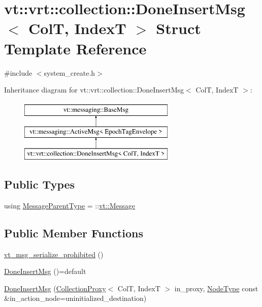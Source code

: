 \hypertarget{structvt_1_1vrt_1_1collection_1_1_done_insert_msg}{}\section{vt\+:\+:vrt\+:\+:collection\+:\+:Done\+Insert\+Msg$<$ ColT, IndexT $>$ Struct Template Reference}
\label{structvt_1_1vrt_1_1collection_1_1_done_insert_msg}


{\ttfamily \#include $<$system\+\_\+create.\+h$>$}

Inheritance diagram for vt\+:\+:vrt\+:\+:collection\+:\+:Done\+Insert\+Msg$<$ ColT, IndexT $>$\+:\begin{figure}[H]
\begin{center}
\leavevmode
\includegraphics[height=3.000000cm]{structvt_1_1vrt_1_1collection_1_1_done_insert_msg}
\end{center}
\end{figure}
\subsection*{Public Types}
\begin{DoxyCompactItemize}
\item 
using \hyperlink{structvt_1_1vrt_1_1collection_1_1_done_insert_msg_a17cd2dd89315b0b113809e54f5a86b6a}{Message\+Parent\+Type} = \+::\hyperlink{namespacevt_a3a3ddfef40b4c90915fa43cdd5f129ea}{vt\+::\+Message}
\end{DoxyCompactItemize}
\subsection*{Public Member Functions}
\begin{DoxyCompactItemize}
\item 
\hyperlink{structvt_1_1vrt_1_1collection_1_1_done_insert_msg_af9c11a30581c60e18dfa0cee4841d793}{vt\+\_\+msg\+\_\+serialize\+\_\+prohibited} ()
\item 
\hyperlink{structvt_1_1vrt_1_1collection_1_1_done_insert_msg_a74e87cb9d8c83b77960b544e61cee9ef}{Done\+Insert\+Msg} ()=default
\item 
\hyperlink{structvt_1_1vrt_1_1collection_1_1_done_insert_msg_add6d51da4d2b2e79624fb8f153d1cea4}{Done\+Insert\+Msg} (\hyperlink{structvt_1_1vrt_1_1collection_1_1_collection_proxy}{Collection\+Proxy}$<$ ColT, IndexT $>$ in\+\_\+proxy, \hyperlink{namespacevt_a866da9d0efc19c0a1ce79e9e492f47e2}{Node\+Type} const \&in\+\_\+action\+\_\+node=uninitialized\+\_\+destination)
\end{DoxyCompactItemize}
